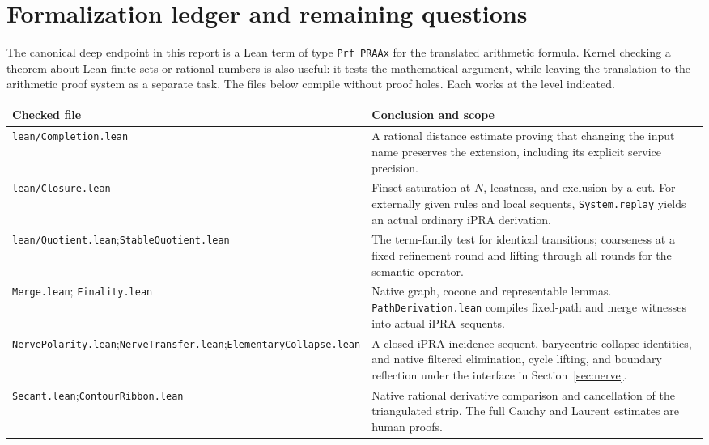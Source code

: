 \section{Formalization ledger and remaining questions}\label{sec:formalization}
The canonical deep endpoint in this report is a Lean term of type \texttt{Prf PRAAx} for the translated arithmetic formula. Kernel checking a theorem about Lean finite sets or rational numbers is also useful: it tests the mathematical argument, while leaving the translation to the arithmetic proof system as a separate task. The files below compile without proof holes. Each works at the level indicated.

\begin{center}\small
\begin{tabular}{@{}>{\raggedright\arraybackslash}p{.31\linewidth}>{\raggedright\arraybackslash}p{.63\linewidth}@{}}
\toprule
\textbf{Checked file} & \textbf{Conclusion and scope}\\
\midrule
\texttt{lean/Completion.lean} & A rational distance estimate proving that changing the input name preserves the extension, including its explicit service precision.\\[4pt]
\texttt{lean/Closure.lean} & Finset saturation at $N$, leastness, and exclusion by a cut. For externally given rules and local sequents, \texttt{System.replay} yields an actual ordinary iPRA derivation.\\[4pt]
\texttt{lean/Quotient.lean};\newline\texttt{StableQuotient.lean} & The term-family test for identical transitions; coarseness at a fixed refinement round and lifting through all rounds for the semantic operator.\\[4pt]
\texttt{Merge.lean}; \texttt{Finality.lean} & Native graph, cocone and representable lemmas. \texttt{PathDerivation.lean} compiles fixed-path and merge witnesses into actual iPRA sequents.\\[4pt]
\texttt{NervePolarity.lean};\newline\texttt{NerveTransfer.lean};\newline\texttt{ElementaryCollapse.lean} & A closed iPRA incidence sequent, barycentric collapse identities, and native filtered elimination, cycle lifting, and boundary reflection under the interface in Section~\ref{sec:nerve}.\\[4pt]
\texttt{Secant.lean};\newline\texttt{ContourRibbon.lean} & Native rational derivative comparison and cancellation of the triangulated strip. The full Cauchy and Laurent estimates are human proofs.\\
\bottomrule
\end{tabular}
\end{center}

